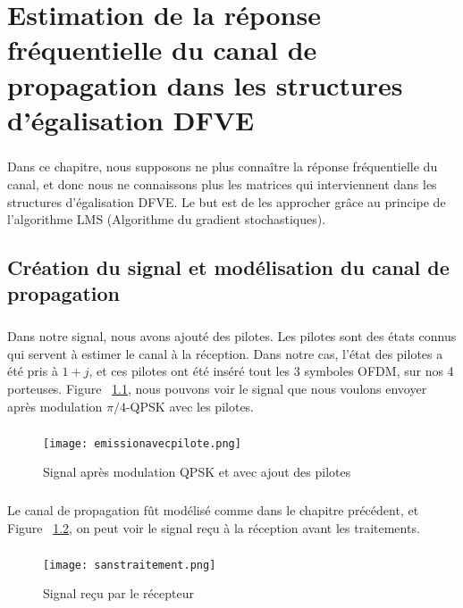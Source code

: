\chapter{Estimation de la réponse fréquentielle du canal de propagation dans les structures d'égalisation DFVE}

\paragraph{}
Dans ce chapitre, nous supposons ne plus connaître la réponse fréquentielle du
canal, et donc nous ne connaissons plus les matrices qui interviennent dans les
structures d'égalisation DFVE. Le but est de les approcher grâce au principe de
l'algorithme LMS (Algorithme du gradient stochastiques).

\section{Création du signal et modélisation du canal de propagation}
\paragraph{}
Dans notre signal, nous avons ajouté des pilotes. Les pilotes sont des états
connus qui servent à estimer le canal à la réception. Dans notre cas, l'état des
pilotes a été pris à $1+j$, et ces pilotes ont été inséré tout les 3 symboles
OFDM, sur nos 4 porteuses. Figure ~\ref{etatavecpilotes}, nous pouvons voir le
signal que nous voulons envoyer après modulation $\pi/4$-QPSK avec les pilotes.
\paragraph{}
\vspace{1\baselineskip}
\begin{figure}[!h]
  \centering
  \texttt{[image: emissionavecpilote.png]}
  \caption{Signal après modulation QPSK et avec ajout des pilotes }
	\label{etatavecpilotes}
\end{figure}
\vspace{10\baselineskip}

\paragraph{}
Le canal de propagation fût modélisé comme dans le chapitre précédent, et Figure
~\ref{sanstraitement}, on peut voir le signal reçu à la réception avant les
traitements.
\paragraph{}
\vspace{1\baselineskip}
\begin{figure}[!h]
  \centering
  \texttt{[image: sanstraitement.png]}
  \caption{Signal reçu par le récepteur}
	\label{sanstraitement}
\end{figure}
\vspace{2\baselineskip}



